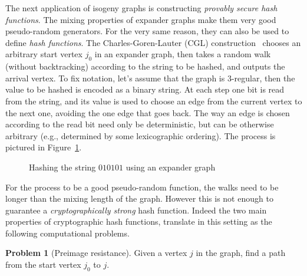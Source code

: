 \documentclass[10pt]{article}
\theoremstyle{plain}
\theoremstyle{definition}
\newtheorem{problem}{Problem}
\begin{document}
The next application of isogeny graphs is constructing \emph{provably
  secure hash functions}. %
The mixing properties of expander graphs make them very good
pseudo-random generators. %
For the very same reason, they can also be used to define \emph{hash
  functions}. %
The Charles-Goren-Lauter (CGL)
construction~\cite{charles+lauter+goren09} chooses an arbitrary start
vertex $j_0$ in an expander graph, then takes a random walk (without
backtracking) according to the string to be hashed, and outputs the
arrival vertex. %
To fix notation, let's assume that the graph is $3$-regular, then the
value to be hashed is encoded as a binary string. %
At each step one bit is read from the string, and its value is used to
choose an edge from the current vertex to the next one, avoiding the
one edge that goes back. %
The way an edge is chosen according to the read bit need only be
deterministic, but can be otherwise arbitrary (e.g., determined by
some lexicographic ordering). %
The process is pictured in Figure~\ref{fig:hash}.


\begin{figure}
  \centering
  \caption{Hashing the string $010101$ using an expander graph}
  \label{fig:hash}
\end{figure}

For the process to be a good pseudo-random function, the walks need to
be longer than the mixing length of the graph. %
However this is not enough to guarantee a \emph{cryptographically
  strong} hash function. %
Indeed the two main properties of cryptographic hash functions,
translate in this setting as the following computational problems.

\begin{problem}[Preimage resistance]
  Given a vertex $j$ in the graph, find a path from the start vertex
  $j_0$ to $j$.
\end{problem}
\end{document}
